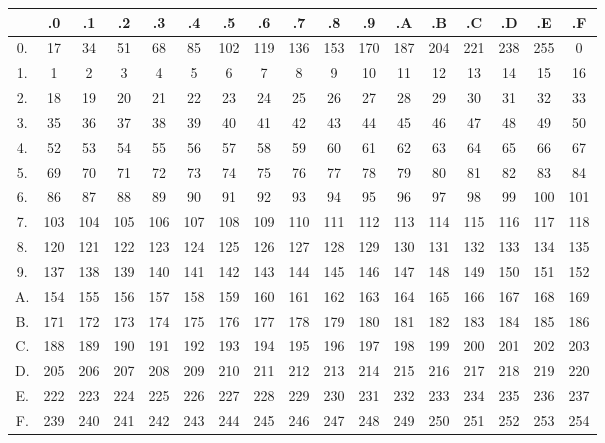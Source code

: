 \begin{table}
  \centering
  \footnotesize
  \renewcommand\tabcolsep{3pt}
  \renewcommand\arraystretch{1.2}
  \begin{tabular}{c|cccccccccccccccc}
    & .0 & .1 & .2 & .3 & .4 & .5 & .6 & .7 & .8 & .9 & .A & .B & .C & .D & .E & .F \\
    \hline
    0. &  17 &  34  & 51  & 68 &  85 &  102 & 119 & 136 & 153 & 170  &187 & 204 & 221  & 238&  255&    0\\
    1. &   1 &   2  &  3  &  4 &   5 &    6 &   7 &   8 &   9 &  10  & 11 &  12 &  13  &  14&   15&   16\\
    2. &  18 &  19  & 20  & 21 &  22 &   23 &  24 &  25 &  26 &  27  & 28 &  29 &  30  &  31&   32&   33\\
    3. &  35 &  36  & 37  & 38 &  39 &   40 &  41 &  42 &  43 &  44  & 45 &  46 &  47  &  48&   49&   50\\
    4. &  52 &  53  & 54  & 55 &  56 &   57 &  58 &  59 &  60 &  61  & 62 &  63 &  64  &  65&   66&   67\\
    5. &  69 &  70  & 71  & 72 &  73 &   74 &  75 &  76 &  77 &  78  & 79 &  80 &  81  &  82&   83&   84\\
    6. &  86 &  87  & 88  & 89 &  90 &   91 &  92 &  93 &  94 &  95  & 96 &  97 &  98  &  99&  100&  101\\
    7. & 103 & 104  &105  &106 & 107 &  108 & 109 & 110 & 111 & 112  &113 & 114 & 115  & 116&  117&  118\\
    8. & 120 & 121  &122  &123 & 124 &  125 & 126 & 127 & 128 & 129  &130 & 131 & 132  & 133&  134&  135\\
    9. & 137 & 138  &139  &140 & 141 &  142 & 143 & 144 & 145 & 146  &147 & 148 & 149  & 150&  151&  152\\
    A. & 154 & 155  &156  &157 & 158 &  159 & 160 & 161 & 162 & 163  &164 & 165 & 166  & 167&  168&  169\\
    B. & 171 & 172  &173  &174 & 175 &  176 & 177 & 178 & 179 & 180  &181 & 182 & 183  & 184&  185&  186\\
    C. & 188 & 189  &190  &191 & 192 &  193 & 194 & 195 & 196 & 197  &198 & 199 & 200  & 201&  202&  203\\
    D. & 205 & 206  &207  &208 & 209 &  210 & 211 & 212 & 213 & 214  &215 & 216 & 217  & 218&  219&  220\\
    E. & 222 & 223  &224  &225 & 226 &  227 & 228 & 229 & 230 & 231  &232 & 233 & 234  & 235&  236&  237\\
    F. & 239 & 240  &241  &242 & 243 &  244 & 245 & 246 & 247 & 248  &249 & 250 & 251  & 252&  253&  254\\
  \end{tabular}
\end{table}
